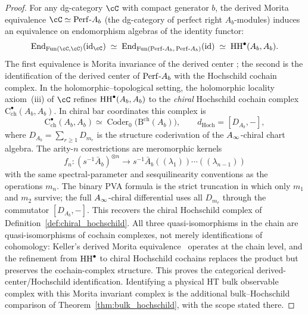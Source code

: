 \begin{proof}
For any dg-category $\cC$ with compact generator $b$, the derived
Morita equivalence $\cC \simeq \Perf\text{-}A_b$ (the dg-category
of perfect right $A_b$-modules) induces an equivalence on
endomorphism algebras of the identity functor:
\[
 \End_{\operatorname{Fun}(\cC,\cC)}(\id_\cC)
 \;\simeq\;
 \End_{\operatorname{Fun}(\Perf\text{-}A_b,\,\Perf\text{-}A_b)}(\id)
 \;\simeq\;
 \HH^\bullet(A_b, A_b).
\]
The first equivalence is Morita invariance of the derived center
\cite{Kel06}; the second is the identification of the derived
center of $\mathrm{Perf}\text{-}A_b$ with the Hochschild cochain complex.
In the holomorphic--topological setting, the holomorphic locality
axiom~(iii) of $\cC$ refines $\operatorname{HH}^\bullet(A_b, A_b)$ to the
\emph{chiral} Hochschild cochain complex
$\mathrm{C}^\bullet_{\mathrm{ch}}(A_b,A_b)$. In chiral bar
coordinates this complex is
\[
\mathrm{C}^\bullet_{\mathrm{ch}}(A_b,A_b)
\simeq
\operatorname{Coder}_0\bigl(\mathrm B^{\mathrm{ch}}(A_b)\bigr),
\qquad
d_{\mathrm{Hoch}}=[D_{A_b},-],
\]
where \(D_{A_b}=\sum_{r\ge1}D_{m_r}\) is the structure coderivation of
the \(A_\infty\)-chiral chart algebra. The arity-\(n\) corestrictions are
meromorphic kernels
\[
f_n\colon (s^{-1}\bar A_b)^{\otimes n}\longrightarrow
s^{-1}\bar A_b((\lambda_1))\cdots((\lambda_{n-1}))
\]
with the same spectral-parameter and sesquilinearity conventions as
the operations \(m_n\). The binary PVA formula is the strict truncation
in which only \(m_1\) and \(m_2\) survive; the full \(A_\infty\)-chiral
differential uses all \(D_{m_r}\) through the commutator
\([D_{A_b},-]\).
This recovers the chiral Hochschild complex of
Definition~\ref{def:chiral_hochschild}. All three
quasi-isomorphisms in the chain are quasi-isomorphisms of cochain
complexes, not merely identifications of cohomology: Keller's
derived Morita equivalence~\cite{Kel06} operates at the chain
level, and the refinement from $\operatorname{HH}^\bullet$ to chiral Hochschild
cochains replaces the product but preserves the cochain-complex
structure. This proves the categorical derived-center/Hochschild
identification. Identifying a physical HT bulk observable complex with
this Morita invariant complex is the additional bulk--Hochschild
comparison of Theorem~\ref{thm:bulk_hochschild}, with the scope stated
there.
\end{proof}

